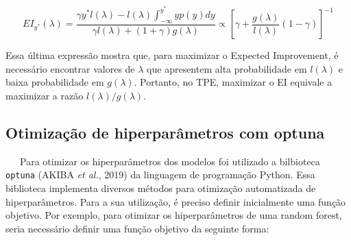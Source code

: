 \documentclass[
  12pt,
  a4paper,
]{scrreprt}
\begin{document}
\[
EI_{y^*}\left(\lambda\right) = \frac{\gamma y^* l\left(\lambda\right) - l\left(\lambda\right) \int_{-\infty}^{y^*} yp\left(y\right)dy}{\gamma l\left(\lambda\right) + \left(1 + \gamma\right)g\left(\lambda\right)} \propto \left[\gamma + \frac{g\left(\lambda\right)}{l\left(\lambda\right)} \left(1 - \gamma\right)\right]^{-1}
\]

Essa última expressão mostra que, para maximizar o Expected Improvement,
é necessário encontrar valores de \(\lambda\) que apresentem alta
probabilidade em \(l\left(\lambda\right)\) e baixa probabilidade em
\(g\left(\lambda\right)\). Portanto, no TPE, maximizar o EI equivale a
maximizar a razão \(l\left(\lambda\right) / g\left(\lambda\right)\).

\subsection{Otimização de hiperparâmetros com
optuna}\label{otimizauxe7uxe3o-de-hiperparuxe2metros-com-optuna}

~~~Para otimizar os hiperparâmetros dos modelos foi utilizado a
bilbioteca \texttt{optuna} (AKIBA \emph{et al.}, 2019) da linguagem de
programação Python. Essa biblioteca implementa diversos métodos para
otimização automatizada de hiperparâmetros. Para a sua utilização, é
preciso definir inicialmente uma função objetivo. Por exemplo, para
otimizar os hiperparâmetros de uma random forest, seria necessário
definir uma função objetivo da seguinte forma:
\end{document}
